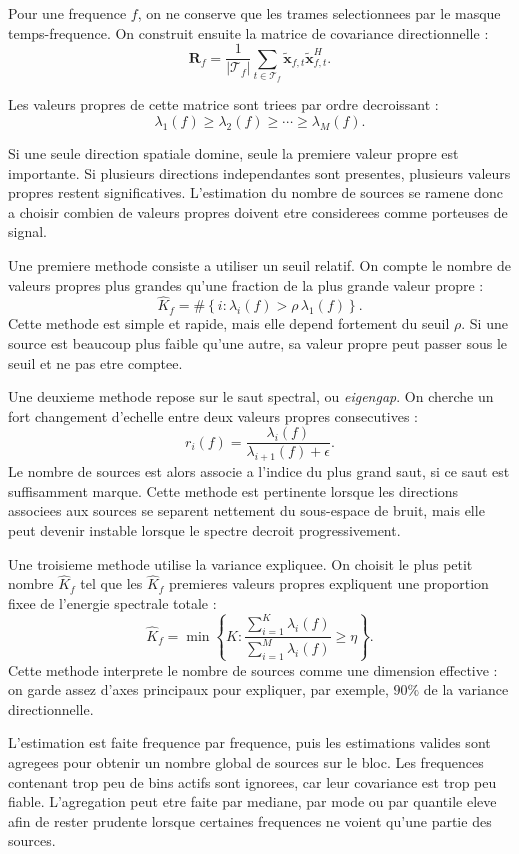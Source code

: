 \documentclass[11pt,a4paper]{article}
\begin{document}
Pour une frequence $f$, on ne conserve que les trames selectionnees par le
masque temps-frequence. On construit ensuite la matrice de covariance
directionnelle :
\[
  \mathbf{R}_f
    =
    \frac{1}{|\mathcal{T}_f|}
    \sum_{t\in\mathcal{T}_f}
    \tilde{\mathbf{x}}_{f,t}
    \tilde{\mathbf{x}}_{f,t}^{H}.
\]

Les valeurs propres de cette matrice sont triees par ordre decroissant :
\[
  \lambda_1(f)\geq \lambda_2(f)\geq \cdots \geq \lambda_M(f).
\]

Si une seule direction spatiale domine, seule la premiere valeur propre est
importante. Si plusieurs directions independantes sont presentes, plusieurs
valeurs propres restent significatives. L'estimation du nombre de sources se
ramene donc a choisir combien de valeurs propres doivent etre considerees comme
porteuses de signal.

Une premiere methode consiste a utiliser un seuil relatif. On compte le nombre
de valeurs propres plus grandes qu'une fraction de la plus grande valeur propre :
\[
  \hat{K}_f
    =
    \#\left\{
      i :
      \lambda_i(f) > \rho\,\lambda_1(f)
    \right\}.
\]
Cette methode est simple et rapide, mais elle depend fortement du seuil
$\rho$. Si une source est beaucoup plus faible qu'une autre, sa valeur propre
peut passer sous le seuil et ne pas etre comptee.

Une deuxieme methode repose sur le saut spectral, ou \emph{eigengap}. On cherche
un fort changement d'echelle entre deux valeurs propres consecutives :
\[
  r_i(f)
    =
    \frac{\lambda_i(f)}
         {\lambda_{i+1}(f)+\epsilon}.
\]
Le nombre de sources est alors associe a l'indice du plus grand saut, si ce saut
est suffisamment marque. Cette methode est pertinente lorsque les directions
associees aux sources se separent nettement du sous-espace de bruit, mais elle
peut devenir instable lorsque le spectre decroit progressivement.

Une troisieme methode utilise la variance expliquee. On choisit le plus petit
nombre $\hat{K}_f$ tel que les $\hat{K}_f$ premieres valeurs propres expliquent
une proportion fixee de l'energie spectrale totale :
\[
  \hat{K}_f
    =
    \min
    \left\{
      K :
      \frac{\sum_{i=1}^{K}\lambda_i(f)}
           {\sum_{i=1}^{M}\lambda_i(f)}
      \geq \eta
    \right\}.
\]
Cette methode interprete le nombre de sources comme une dimension effective :
on garde assez d'axes principaux pour expliquer, par exemple, $90\%$ de la
variance directionnelle.

L'estimation est faite frequence par frequence, puis les estimations valides
sont agregees pour obtenir un nombre global de sources sur le bloc. Les
frequences contenant trop peu de bins actifs sont ignorees, car leur covariance
est trop peu fiable. L'agregation peut etre faite par mediane, par mode ou par
quantile eleve afin de rester prudente lorsque certaines frequences ne voient
qu'une partie des sources.
\end{document}
